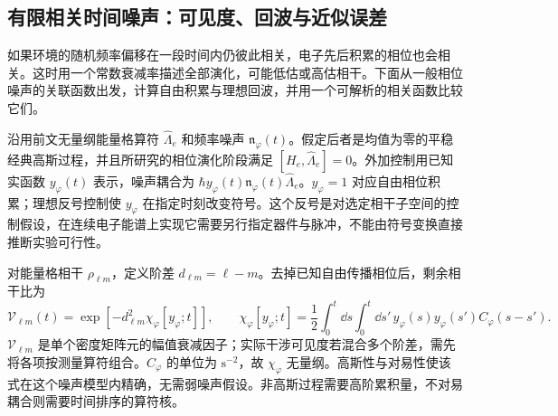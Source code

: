 \subsection{有限相关时间噪声：可见度、回波与近似误差}
\label{sec:electron-colored-noise-applications}

如果环境的随机频率偏移在一段时间内仍彼此相关，电子先后积累的相位也会相关。这时用一个常数衰减率描述全部演化，可能低估或高估相干。下面从一般相位噪声的关联函数出发，计算自由积累与理想回波，并用一个可解析的相关函数比较它们。

沿用前文无量纲能量格算符 $\hat\Lambda_e$ 和频率噪声 $\mathfrak n_\varphi(t)$。假定后者是均值为零的平稳经典高斯过程，并且所研究的相位演化阶段满足 $[H_e,\hat\Lambda_e]=0$。外加控制用已知实函数 $y_\varphi(t)$ 表示，噪声耦合为 $\hbar y_\varphi(t)\mathfrak n_\varphi(t)\hat\Lambda_e$。$y_\varphi=1$ 对应自由相位积累；理想反号控制使 $y_\varphi$ 在指定时刻改变符号。这个反号是对选定相干子空间的控制假设，在连续电子能谱上实现它需要另行指定器件与脉冲，不能由符号变换直接推断实验可行性。

对能量格相干 $\rho_{\ell m}$，定义阶差 $d_{\ell m}=\ell-m$。去掉已知自由传播相位后，剩余相干比为
\begin{equation}
 \mathcal V_{\ell m}(t)
 =\exp[-d_{\ell m}^2\chi_\varphi[y_\varphi;t]],\qquad
 \chi_\varphi[y_\varphi;t]
 =\frac12\int_0^t\dd s\int_0^t\dd s'\,
 y_\varphi(s)y_\varphi(s')C_\varphi(s-s').
 \label{eq:electron-noise-filter-time}
\end{equation}
$\mathcal V_{\ell m}$ 是单个密度矩阵元的幅值衰减因子；实际干涉可见度若混合多个阶差，需先将各项按测量算符组合。$C_\varphi$ 的单位为 $\mathrm{s^{-2}}$，故 $\chi_\varphi$ 无量纲。高斯性与对易性使该式在这个噪声模型内精确，无需弱噪声假设。非高斯过程需要高阶累积量，不对易耦合则需要时间排序的算符核。

